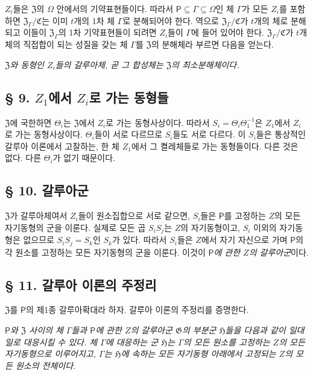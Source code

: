 \(Z_i\)들은 \(\mathfrak Z\)의 \(\Omega\) 안에서의 기약표현들이다. 따라서 \(\mathsf P\subseteq\Gamma\subseteq\Omega\)인 체 \(\Gamma\)가 모든 \(Z_i\)를 포함하면 \(\mathfrak Z_\Gamma/\mathfrak C\)는 이미 \(t\)개의 1차 체 \(\Gamma\)로 분해되어야 한다. 역으로 \(\mathfrak Z_\Gamma/\mathfrak C\)가 \(t\)개의 체로 분해되고 이들이 \(\mathfrak Z_\Gamma\)의 1차 기약표현들이 되려면 \(Z_i\)들이 \(\Gamma\)에 들어 있어야 한다. \(\mathfrak Z_\Gamma/\mathfrak C\)가 \(t\)개 체의 직접합이 되는 성질을 갖는 체 \(\Gamma\)를 \(\mathfrak Z\)의 분해체라 부르면 다음을 얻는다.

\emph{\(\mathfrak Z\)와 동형인 \(Z_i\)들의 갈루아체, 곧 그 합성체는 \(\mathfrak Z\)의 최소분해체이다.}

\subsection*{§ 9. \(Z_1\)에서 \(Z_i\)로 가는 동형들}

\(\mathfrak Z\)에 국한하면 \(\Theta_i\)는 \(\mathfrak Z\)에서 \(Z_i\)로 가는 동형사상이다. 따라서 \(S_i=\Theta_i\Theta_1^{-1}\)은 \(Z_1\)에서 \(Z_i\)로 가는 동형사상이다. \(\Theta_i\)들이 서로 다르므로 \(S_i\)들도 서로 다르다. 이 \(S_i\)들은 통상적인 갈루아 이론에서 고찰하는, 한 체 \(Z_1\)에서 그 켤레체들로 가는 동형들이다. 다른 것은 없다. 다른 \(\Theta_i\)가 없기 때문이다.

\subsection*{§ 10. 갈루아군}

\(\mathfrak Z\)가 갈루아체여서 \(Z_i\)들이 원소집합으로 서로 같으면, \(S_i\)들은 \(\mathsf P\)를 고정하는 \(Z\)의 모든 자기동형의 군을 이룬다. 실제로 모든 곱 \(S_iS_j\)는 \(Z\)의 자기동형이고, \(S_i\) 이외의 자기동형은 없으므로 \(S_iS_j=S_k\)인 \(S_k\)가 있다. 따라서 \(S_i\)들은 \(Z\)에서 자기 자신으로 가며 \(\mathsf P\)의 각 원소를 고정하는 모든 자기동형의 군을 이룬다. 이것이 \emph{\(\mathsf P\)에 관한 \(Z\)의 갈루아군}이다.

\subsection*{§ 11. 갈루아 이론의 주정리}

\(\mathfrak Z\)를 \(\mathsf P\)의 제1종 갈루아확대라 하자. 갈루아 이론의 주정리를 증명한다.

\emph{\(\mathsf P\)와 \(\mathfrak Z\) 사이의 체 \(\Gamma\)들과 \(\mathsf P\)에 관한 \(Z\)의 갈루아군 \(\mathfrak G\)의 부분군 \(\mathfrak H\)들을 다음과 같이 일대일로 대응시킬 수 있다. 체 \(\Gamma\)에 대응하는 군 \(\mathfrak H\)는 \(\Gamma\)의 모든 원소를 고정하는 \(Z\)의 모든 자기동형으로 이루어지고, \(\Gamma\)는 \(\mathfrak H\)에 속하는 모든 자기동형 아래에서 고정되는 \(Z\)의 모든 원소의 전체이다.}

